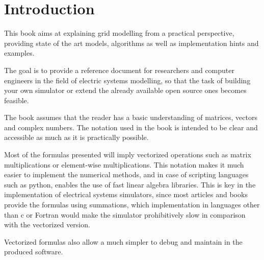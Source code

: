 \documentclass[a4paper,twoside,fleqn]{tufte-book}
\begin{document}
\tableofcontents

\listoffigures

\listoftables


\mainmatter
\chapter{Introduction}

This book aims at explaining grid modelling from a practical perspective, providing state of the art models, algorithms as well as implementation hints and examples.

The goal is to provide a reference document for researchers and computer engineers in the field of electric systems modelling, so that the task of building your own simulator or extend the already available open source ones becomes feasible.

The book assumes that the reader has a basic understanding of matrices, vectors and complex numbers. The notation used in the book is intended to be clear and accessible as much as it is practically possible.

Most of the formulas presented will imply vectorized operations such as matrix multiplications or element-wise multiplications. This notation makes it much easier to implement the numerical methods, and in case of scripting languages such as python, enables the use of fast linear algebra libraries. This is key in the implementation of electrical systems simulators, since most articles and books provide the formulas using summations, which implementation in languages other than c or Fortran would make the simulator prohibitively slow in comparison with the vectorized version.

Vectorized formulas also allow a much simpler to debug and maintain in the produced software.


\end{document}
